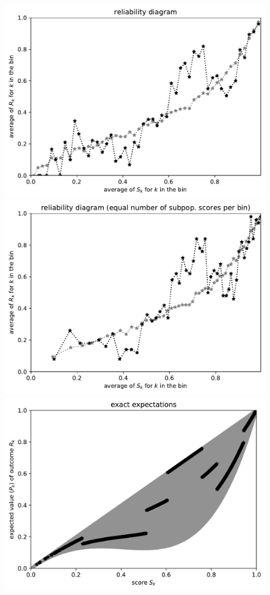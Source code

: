 \documentclass{article}
\begin{document}
\begin{figure}
\begin{centering}
\parbox{\imsize}{\includegraphics[width=\imsize]
                 {./codes/unweighted/50000_2500_50_1/equiscore.pdf}}
\quad\quad
\parbox{\imsize}{\includegraphics[width=\imsize]
                 {./codes/unweighted/50000_2500_50_1/equisamps.pdf}}

\vspace{\vertsep}

\parbox{\imsize}{\includegraphics[width=\imsize]
                 {./codes/unweighted/50000_2500_10_1/exact.jpg}}


\end{centering}
\end{figure}
\end{document}
